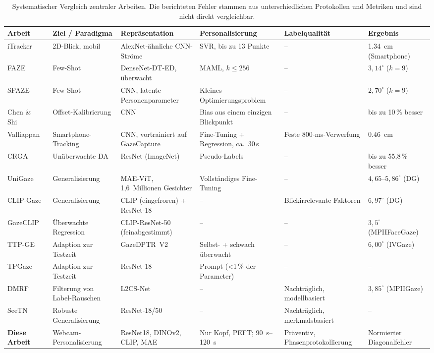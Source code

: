 \documentclass[
  11pt,
  a4paper,
  oneside,
  DIV=12,                 %
  BCOR=8mm,               %
  parskip=half,           %
  headings=normal,
  bibliography=totoc,     %
  listof=totoc            %
]{scrreprt}
\begin{document}
\begin{table}[htbp]
  \centering
  \footnotesize
  \setlength{\tabcolsep}{3pt}
  \caption{Systematischer Vergleich zentraler Arbeiten. Die berichteten Fehler stammen aus unterschiedlichen Protokollen und Metriken und sind nicht direkt vergleichbar.}
  \label{tab:sota_vergleich}
  \begin{tabularx}{\textwidth}{L{2.3cm} L{2.4cm} L{2.6cm} L{2.6cm} Y L{1.9cm}}
    \toprule
    \textbf{Arbeit} & \textbf{Ziel / Paradigma} & \textbf{Repräsentation} & \textbf{Personalisierung} & \textbf{Labelqualität} & \textbf{Ergebnis} \\
    \midrule
    iTracker~\cite{krafka2016itracker} & 2D-Blick, mobil & AlexNet-ähnliche CNN-Ströme & SVR, bis zu 13 Punkte & -- & \SI{1,34}{\centi\metre} (Smartphone) \\
    FAZE~\cite{park2019faze} & Few-Shot & DenseNet-DT-ED, überwacht & MAML, $k \le 256$ & -- & $3,14^\circ$ ($k=9$) \\
    SPAZE~\cite{linden2019spaze} & Few-Shot & CNN, latente Personenparameter & Kleines Optimierungsproblem & -- & $2,70^\circ$ ($k=9$) \\
    Chen \& Shi~\cite{chen2020offset} & Offset-Kalibrierung & CNN & Bias aus einem einzigen Blickpunkt & -- & bis zu 10\,\% besser \\
    Valliappan~\cite{valliappan2020smartphone} & Smartphone-Tracking & CNN, vortrainiert auf GazeCapture & Fine-Tuning + Regression, ca.\ 30\,s & Feste 800-ms-Verwerfung & \SI{0,46}{\centi\metre} \\
    CRGA~\cite{wang2022crga} & Unüberwachte DA & ResNet (ImageNet) & Pseudo-Labels & -- & bis zu 55,8\,\% besser \\
    UniGaze~\cite{qin2026unigaze} & Generalisierung & MAE-ViT, 1,6~Millionen Gesichter & Vollständiges Fine-Tuning & -- & $4,65$--$5,86^\circ$ (DG) \\
    CLIP-Gaze~\cite{yin2024clipgaze} & Generalisierung & CLIP (eingefroren) + ResNet-18 & -- & Blickirrelevante Faktoren & $6,97^\circ$ (DG) \\
    GazeCLIP~\cite{wang2026gazeclip} & Überwachte Regression & CLIP-ResNet-50 (feinabgestimmt) & -- & -- & $3,5^\circ$ (MPIIFaceGaze) \\
    TTP-GE~\cite{nagpure2025ttpge} & Adaption zur Testzeit & GazeDPTR~V2 & Selbst- + schwach überwacht & -- & $6,00^\circ$ (IVGaze) \\
    TPGaze~\cite{liu2024tpgaze} & Adaption zur Testzeit & ResNet-18 & Prompt (<1\,\% der Parameter) & -- & -- \\
    DMRF~\cite{jiang2026dmrf} & Filterung von Label-Rauschen & L2CS-Net & -- & Nachträglich, modellbasiert & $3,85^\circ$ (MPIIGaze) \\
    SeeTN~\cite{peng2026seetn} & Robuste Generalisierung & ResNet-18/50 & -- & Nachträglich, merkmalsbasiert & -- \\
    \midrule
    \textbf{Diese Arbeit} & Webcam-Personalisierung & ResNet18, DINOv2, CLIP, MAE & Nur Kopf, PEFT; \SIrange{90}{120}{\second} & Präventiv, Phasenprotokollierung & Normierter Diagonalfehler \\
    \bottomrule
  \end{tabularx}
\end{table}
\end{document}
